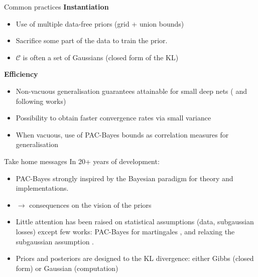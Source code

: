 \documentclass{presentation}
\begin{document}
\begin{xframe}{Common practices}
    \vspace{0.5cm}
    {\bf Instantiation}
    \begin{itemize}
        \item Use of multiple data-free priors (grid + union bounds) 
        \item Sacrifice some part of the data to train the prior.
        \item $\mathcal{C}$ is often a set of Gaussians (closed form of the KL)
    \end{itemize}
    \vspace{1cm}
    {\bf Efficiency}
        \begin{itemize}
            \item Non-vacuous generalisation guarantees attainable for small deep nets (\citealp{dziugaite2017computing} and following works)
            \item Possibility to obtain faster convergence rates via small variance \citep{tolstikhin2013pac}
            \item When vacuous, use of PAC-Bayes bounds as correlation measures for generalisation \citep{neyshabur2017explor}
        \end{itemize}
\end{xframe}

\begin{xframe}{Take home messages}
    \vspace{0.5cm}
    In 20+ years of development:
    \begin{itemize}
      \item PAC-Bayes strongly inspired by the Bayesian paradigm for theory and implementations.
      \item $\rightarrow$ consequences on the vision of the priors
      \item Little attention has been raised on statistical assumptions (\iid data, subgaussian losses) except few works: PAC-Bayes for martingales \citep{seldin2012pac}, and relaxing the subgaussian assumption \citep{kuzborskij2019efron}.
      \item Priors and posteriors are designed \wrt to the KL divergence: either Gibbs (closed form) or Gaussian (computation)
    \end{itemize}
    \vspace{0.5 cm}
    {}
  \end{xframe}
\end{document}
